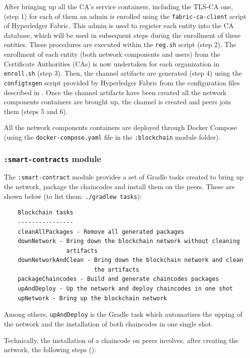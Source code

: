 \documentclass{scrartcl}
\begin{document}
After bringing up all the CA's service containers, including the TLS-CA one, (step 1) for each of them an admin is enrolled using the \texttt{fabric-ca-client} script of Hyperledger Fabric.
%
This admin is used to register each entity into the CA database, which will be used in subsequent steps during the enrollment of these entities.
%
These procedures are executed within the \texttt{reg.sh} script (step 2).
%
The enrollment of each entity (both network components and users) from the Certificate Authorities (CAs) is now undertaken for each organization in \texttt{enroll.sh} (step 3).
%
Then, the channel artifacts are generated (step 4) using the \texttt{configtxgen} script provided by Hyperledger Fabric from the configuration files described in .
%
Once the channel artifacts have been created all the network components containers are brought up, the channel is created and peers join them (steps 5 and 6).

All the network components containers are deployed through Docker Compose (using the \texttt{docker-compose.yaml} file in the \texttt{:blockchain} module folder).

\subsubsection*{\texttt{:smart-contracts} module}

The \texttt{:smart-contract} module provides a set of Gradle tasks created to bring up the network, package the chaincodes and install them on the peers.
%
These are shown below (to list them: \texttt{./gradlew tasks}):

\begin{verbatim}
    Blockchain tasks
    ----------------
    cleanAllPackages - Remove all generated packages
    downNetwork - Bring down the blockchain network without cleaning
                  artifacts
    downNetworkAndClean - Bring down the blockchain network and clean
                          the artifacts
    packageChaincodes - Build and generate chaincodes packages
    upAndDeploy - Up the network and deploy chaincodes in one shot
    upNetwork - Bring up the blockchain network
\end{verbatim}

Among others, \texttt{upAndDeploy} is the Gradle task which automatizes the upping of the network and the installation of both chaincodes in one single shot.

Technically, the installation of a chaincode on peers involves, after creating the network, the following steps ():
\end{document}
